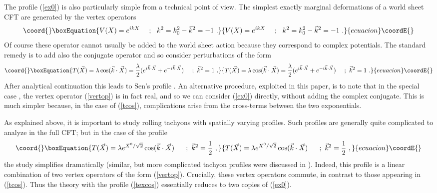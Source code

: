 \documentclass[a4paper,12pt]{article}
\begin{document}
The profile (\ref{ex0}) is also particularly simple from a technical point of view. The simplest
exactly marginal deformations of a world sheet CFT are generated by the vertex operators
\begin{equation}\coord{}\boxEquation{
V(X)=e^{ikX}~~~~;~~ k^2=k^2_0-\vec{k}^2=-1~.
\label{vertop}
}{
V(X)=e^{ikX}~~~~;~~ k^2=k^2_0-\vec{k}^2=-1~.
}{ecuacion}\coordE{}\end{equation}
Of course these operator cannot usually be added to the world sheet action because they correspond to 
complex potentials. The standard remedy is to add also the conjugate operator and so consider 
perturbations of the form
\begin{equation}\coord{}\boxEquation{
T(\vec{X})=\lambda
\cos(\vec{k}\cdot\vec{X})= {\lambda\over 2}(e^{i\vec{k}\cdot\vec{X}}+e^{-i\vec{k}\cdot\vec{X}})~~~~;
~\vec{k}^2=1~.
\label{tcos}
}{
T(\vec{X})=\lambda
\cos(\vec{k}\cdot\vec{X})= {\lambda\over 2}(e^{i\vec{k}\cdot\vec{X}}+e^{-i\vec{k}\cdot\vec{X}})~~~~;
~\vec{k}^2=1~.
}{ecuacion}\coordE{}\end{equation}
After analytical continuation this leads to Sen's profile 
\coordHE{}.
An alternative procedure, exploited in this paper, is to note that in the special case 
\coordHE{}, \coordHE{} the vertex operator (\ref{vertop}) is in fact real, and so we can consider 
(\ref{ex0}) directly, without adding the complex conjugate. 
This is much simpler because, in the case of (\ref{tcos}), complications arise from
the cross-terms between the two exponentials.

As explained above, it is important to study rolling tachyons with spatially varying profiles. Such profiles are generally quite complicated to analyze in the full CFT; but in the case of the 
profile
\begin{equation}\coord{}\boxEquation{
T(\vec{X})=\lambda e^{X^0/\sqrt{2}}\cos(\vec{k}\cdot\vec{X})~~~~~;~\vec{k}^2={1\over 2}~,
\label{texcos}
}{
T(\vec{X})=\lambda e^{X^0/\sqrt{2}}\cos(\vec{k}\cdot\vec{X})~~~~~;~\vec{k}^2={1\over 2}~,
}{ecuacion}\coordE{}\end{equation}
the study simplifies dramatically (similar, but more complicated tachyon profiles were discussed in \cite{senspac}). Indeed, this profile is a linear combination of two vertex operators of the form (\ref{vertop}). Crucially, these vertex operators commute, in contrast to those
appearing in (\ref{tcos}). Thus the theory with the profile (\ref{texcos}) essentially 
reduces to two copies of (\ref{ex0}). 
\end{document}
